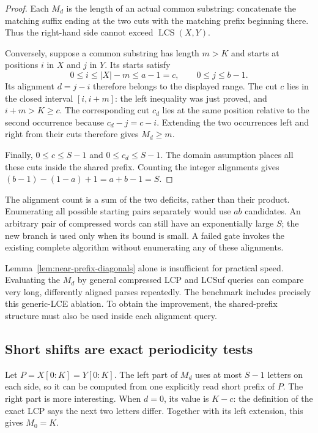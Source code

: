 \documentclass[11pt]{article}
\theoremstyle{definition}
\theoremstyle{remark}
\newcommand{\LCS}{\operatorname{LCS}}
\begin{document}
\begin{proof}
Each $M_d$ is the length of an actual common substring: concatenate the
matching suffix ending at the two cuts with the matching prefix beginning
there. Thus the right-hand side cannot exceed $\LCS(X,Y)$.

Conversely, suppose a common substring has length $m>K$ and starts at
positions $i$ in $X$ and $j$ in $Y$. Its starts satisfy
\[
 0\le i\le |X|-m\le a-1=c,
 \qquad 0\le j\le b-1.
\]
Its alignment $d=j-i$ therefore belongs to the displayed range. The cut
$c$ lies in the closed interval $[i,i+m]$: the left inequality was just
proved, and $i+m>K\ge c$. The corresponding cut $c_d$ lies at the same
position relative to the second occurrence because
$c_d-j=c-i$. Extending the two occurrences left and right from their cuts
therefore gives $M_d\ge m$.

Finally, $0\le c\le S-1$ and $0\le c_d\le S-1$. The domain assumption
places all these cuts inside the shared prefix. Counting the integer
alignments gives $(b-1)-(1-a)+1=a+b-1=S$.
\end{proof}

The alignment count is a sum of the two deficits, rather than their
product. Enumerating all possible starting pairs separately would use
$ab$ candidates. An arbitrary pair of compressed words can still have an
exponentially large $S$; the new branch is used only when its bound is
small. A failed gate invokes the existing complete algorithm without
enumerating any of these alignments.

Lemma~\ref{lem:near-prefix-diagonals} alone is insufficient for practical
speed. Evaluating the $M_d$ by general compressed LCP and LCSuf queries
can compare very long, differently aligned parses repeatedly. The
benchmark includes precisely this generic-LCE ablation. To obtain the
improvement, the shared-prefix structure must also be used inside each
alignment query.

\subsection{Short shifts are exact periodicity tests}

Let $P=X[0:K]=Y[0:K]$. The left part of $M_d$ uses at most $S-1$ letters
on each side, so it can be computed from one explicitly read short prefix
of $P$. The right part is more interesting. When $d=0$, its value is
$K-c$: the definition of the exact LCP says the next two letters differ.
Together with its left extension, this gives $M_0=K$.
\end{document}
